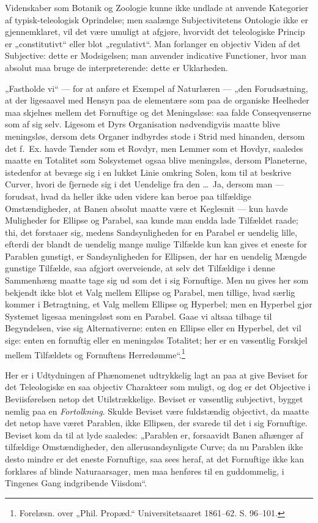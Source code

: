 \documentclass[12pt]{book}
\newcommand{\opage}[1]{\marginnote{\footnotesize\textit{[#1]}}}
\begin{document}
Videnskaber som Botanik og Zoologie kunne ikke undlade
at anvende Kategorier af typisk-teleologisk Oprindelse; men
saalænge Subjectivitetens Ontologie ikke er gjennemklaret, vil
det være umuligt at afgjøre, hvorvidt det teleologiske Princip
er „constitutivt“ eller blot „regulativt“. Man forlanger en
\opage{174}objectiv Viden af det Subjective: dette er Modsigelsen; man
anvender indicative Functioner, hvor man absolut maa bruge
de interpreterende: dette er Uklarheden.

„Fastholde vi“ --- for at anføre et Exempel af Naturlæren
--- „den Forudsætning, at der ligesaavel med Hensyn
paa de elementære som paa de organiske Heelheder maa skjelnes
mellem det Fornuftige og det Meningsløse: saa falde Conseqvenserne
som af sig selv. Ligesom et Dyrs Organisation
nødvendigviis maatte blive meningsløs, dersom dets Organer
indbyrdes stode i Strid med hinanden, dersom det f.\ Ex.
havde Tænder som et Rovdyr, men Lemmer som et Hovdyr,
saaledes maatte en Totalitet som Solsystemet ogsaa blive
meningsløs, dersom Planeterne, istedenfor at bevæge sig i en
lukket Linie omkring Solen, kom til at beskrive Curver, hvori
de fjernede sig i det Uendelige fra den \dots\ Ja, dersom man
--- forudsat, hvad da heller ikke uden videre kan beroe paa
tilfældige Omstændigheder, at Banen absolut maatte være et
Keglesnit --- kun havde Muligheder for Ellipse og Parabel,
saa kunde man endda lade Tilfældet raade; thi, det forstaaer
sig, medens Sandsynligheden for en Parabel er uendelig lille,
efterdi der blandt de uendelig mange mulige Tilfælde kun kan
gives et eneste for Parablen gunstigt, er Sandsynligheden for
Ellipsen, der har en uendelig Mængde gunstige Tilfælde, saa
afgjort overveiende, at selv det Tilfældige i denne Sammenhæng
maatte tage sig ud som det i sig Fornuftige. Men
nu gives her som bekjendt ikke blot et Valg mellem Ellipse og
Parabel, men tillige, hvad særlig kommer i Betragtning, et
Valg mellem Ellipse og Hyperbel; men en Hyperbel gjør
Systemet ligesaa meningsløst som en Parabel. Gaae vi altsaa
tilbage til Begyndelsen, vise sig Alternativerne: enten en
Ellipse eller en Hyperbel, det vil sige: enten en fornuftig eller
en meningsløs Totalitet; her er en væsentlig Forskjel mellem
Tilfældets og Fornuftens Herredømme“.\footnote{Forelæsn. over „Phil. Propæd.“ Universitetsaaret 1861--62.
S. 96--101.} %

\opage{175}Her er i Udtydningen af Phænomenet udtrykkelig lagt
an paa at give Beviset for det Teleologiske en saa objectiv
Charakteer som muligt, og dog er det Objective i Beviisførelsen
netop det Utilstrækkelige. Beviset er væsentlig subjectivt,
bygget nemlig paa en \emph{Fortolkning}. Skulde Beviset være
fuldstændig objectivt, da maatte det netop have været Parablen,
ikke Ellipsen, der svarede til det i sig Fornuftige. Beviset
kom da til at lyde saaledes: „Parablen er, forsaavidt Banen
afhænger af tilfældige Omstændigheder, den allerusandsynligste
Curve; da nu Parablen ikke desto mindre er det eneste Fornuftige,
saa sees heraf, at det Fornuftige ikke kan forklares
af blinde Naturaarsager, men maa henføres til en guddommelig,
i Tingenes Gang indgribende Viisdom“.
\end{document}
